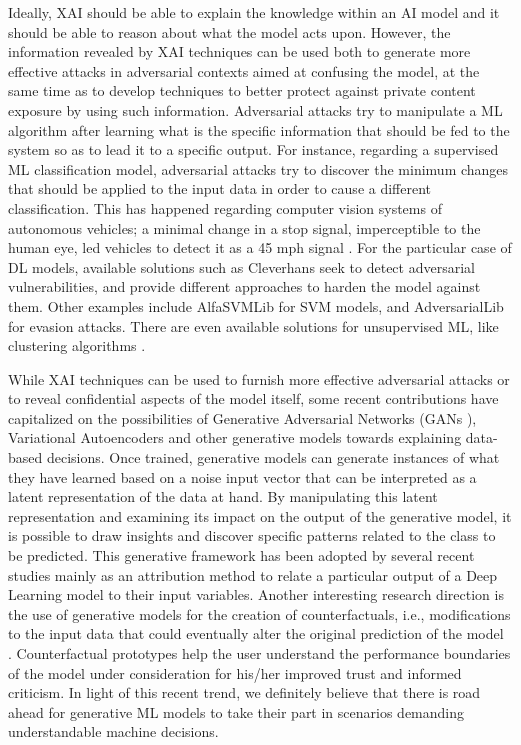 \documentclass[final]{elsarticle}
\begin{document}
Ideally, XAI should be able to explain the knowledge within an AI model and it should be able to reason about what the model acts upon. However, the information revealed by XAI techniques can be used both to generate more effective attacks in adversarial contexts aimed at confusing the model, at the same time as to develop techniques to better protect against private content exposure by using such information. Adversarial attacks \cite{goodfellow2014explaining} try to manipulate a ML algorithm after learning what is the specific information that should be fed to the system so as to lead it to a specific output. For instance, regarding a supervised ML classification model, adversarial attacks try to discover the minimum changes that should be applied to the input data in order to cause a different classification. This has happened regarding computer vision systems of autonomous vehicles; a minimal change in a stop signal, imperceptible to the human eye, led vehicles to detect it as a 45 mph signal \cite{eykholt2017robust}. For the particular case of DL models, available solutions such as Cleverhans \cite{DBLP:journals/corr/GoodfellowPM16} seek to detect adversarial vulnerabilities, and provide different approaches to harden the model against them. Other examples include AlfaSVMLib \cite{Xiao:2015:SVM:2779626.2779777} for SVM models, and AdversarialLib \cite{Biggio:2013:EAA:3120190.3120221} for evasion attacks. There are even available solutions for unsupervised ML, like clustering algorithms \cite{DBLP:journals/corr/abs-1811-09982}.

{\color{black}While XAI techniques can be used to furnish more effective adversarial attacks or to reveal confidential aspects of the model itself, some recent contributions have capitalized on the possibilities of Generative Adversarial Networks (GANs \cite{pan2019recent}), Variational Autoencoders \cite{charte2018practical} and other generative models towards explaining data-based decisions. Once trained, generative models can generate instances of what they have learned based on a noise input vector that can be interpreted as a latent representation of the data at hand. By manipulating this latent representation and examining its impact on the output of the generative model, it is possible to draw insights and discover specific patterns related to the class to be predicted. This generative framework has been adopted by several recent studies \cite{baumgartner2018visual,biffi2018learning} mainly as an attribution method to relate a particular output of a Deep Learning model to their input variables. Another interesting research direction is the use of generative models for the creation of counterfactuals, i.e., modifications to the input data that could eventually alter the original prediction of the model \cite{1907.03077}. Counterfactual prototypes help the user understand the performance boundaries of the model under consideration for his/her improved trust and informed criticism. In light of this recent trend, we definitely believe that there is road ahead for generative ML models to take their part in scenarios demanding understandable machine decisions.}
\end{document}
